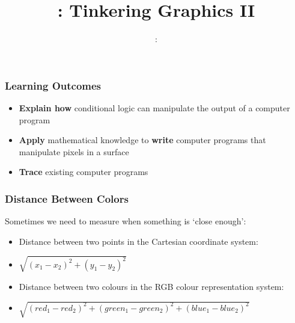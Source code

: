\usepackage{../../beamerthemeFalmouthGamesAcademy}
\usepackage{multimedia}
\graphicspath{ {../../} }


\usepackage[normalem]{ulem}
\usepackage{wasysym}

\usepackage{pdfpages}

\usetikzlibrary{arrows,automata}







\title{\sessionnumber: Tinkering Graphics II}
\subtitle{\modulecode: \moduletitle}

\frame{\titlepage} 

\begin{frame}
	\frametitle{Learning Outcomes}
	\begin{itemize}
		\item \textbf{Explain how} conditional logic can manipulate the output of a computer program
		\item \textbf{Apply} mathematical knowledge to \textbf{write} computer programs that manipulate pixels in a surface
		\item \textbf{Trace} existing computer programs
	\end{itemize}
\end{frame}

\begin{frame}
	\frametitle{Distance Between Colors}
	
	Sometimes we need to measure when something is `close enough':
	
	\begin{itemize}		
		\item Distance between two points in the Cartesian coordinate system:
		\item $\sqrt{(x_{1} - x_{2})^2 + (y_{1} - y_{2})^2}$
		\item Distance between two colours in the RGB colour representation system:
		\item $\sqrt{(red_{1} - red_{2})^2 + (green_{1} - green_{2})^2 + (blue_{1} - blue_{2})^2}$
	\end{itemize}
\end{frame}


